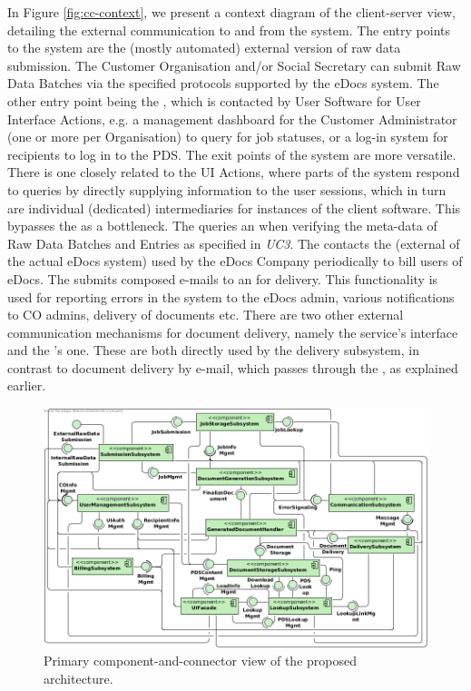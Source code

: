 In Figure \ref{fig:cc-context}, we present a context diagram of the client-server view, detailing the external communication to and from the system. The entry points to the system are the (mostly automated) external version of raw data submission. The Customer Organisation and/or Social Secretary can submit Raw Data Batches via the specified protocols supported by the eDocs system.
The other entry point being the , which is contacted by User Software for User Interface Actions, e.g. a management dashboard for the Customer Administrator (one or more per Organisation) to query for job statuses, or a log-in system for recipients to log in to the PDS.
The exit points of the system are more versatile. There is one closely related to the UI Actions, where parts of the system respond to queries by directly supplying information to the user sessions, which in turn are individual (dedicated) intermediaries for instances of the client software. This bypasses the  as a bottleneck.
The  queries an  when verifying the meta-data of Raw Data Batches and Entries as specified in \emph{UC3}.
The  contacts the  (external of the actual eDocs system) used by the eDocs Company periodically to bill users of eDocs.
The  submits composed e-mails to an  for delivery. This functionality is used for reporting errors in the system to the eDocs admin, various notifications to CO admins, delivery of documents etc.
There are two other external communication mechanisms for document delivery, namely the  service's  interface and the 's one. These are both directly used by the delivery subsystem, in contrast to document delivery by e-mail, which passes through the , as explained earlier.

\begin{figure}[!htp]
    \centering
    \includegraphics[width=\textwidth]{figures/Subsystem Diagram.png}
    \caption{Primary component-and-connector view of the proposed architecture.}\label{fig:cs-primary}
\end{figure}

